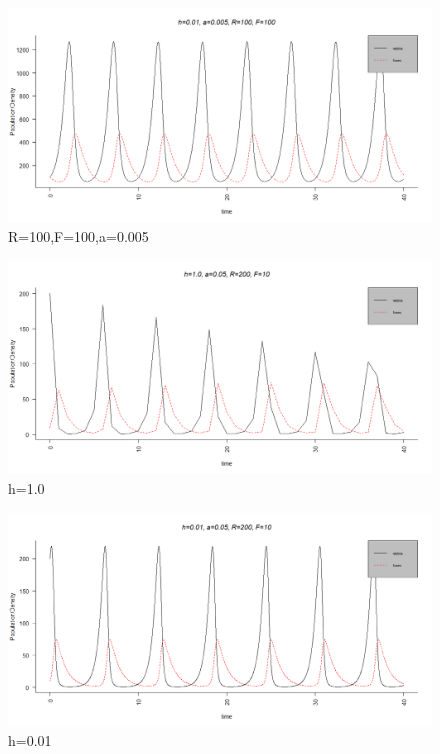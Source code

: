 \documentclass[12pt, oneside]{article}
\begin{document}
\begin{figure}
\centering
\includegraphics[width=1.1\linewidth]{./plot_a005}
\caption{R=100,F=100,a=0.005}
\label{fig:plot_a005}
\end{figure}
\begin{figure}
\centering
\includegraphics[width=1.1\linewidth]{./plot_step1}
\caption{h=1.0}
\label{fig:plot_step1}
\end{figure}
\begin{figure}
\centering
\includegraphics[width=1.1\linewidth]{./plot_step01}
\caption{h=0.01}
\label{fig:plot_step01}
\end{figure}
\end{document}
